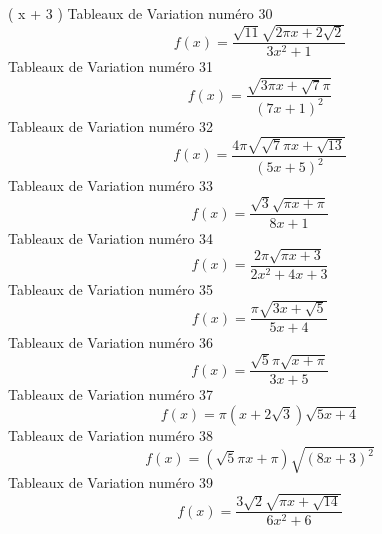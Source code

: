 \documentclass{article}
\begin{document}
 \left( \pi x + 3 \pi\right) \]Tableaux de Variation num\'ero 30 \[f(x) = \frac{\sqrt{11} \sqrt{2 \pi x + 2 \sqrt{2}}}{3 x^{2} + 1}\]Tableaux de Variation num\'ero 31 \[f(x) = \frac{\sqrt{3 \pi x + \sqrt{7} \pi}}{\left(7 x + 1\right)^{2}}\]Tableaux de Variation num\'ero 32 \[f(x) = \frac{4 \pi \sqrt{\sqrt{7} \pi x + \sqrt{13}}}{\left(5 x + 5\right)^{2}}\]Tableaux de Variation num\'ero 33 \[f(x) = \frac{\sqrt{3} \sqrt{\pi x + \pi}}{8 x + 1}\]Tableaux de Variation num\'ero 34 \[f(x) = \frac{2 \pi \sqrt{\pi x + 3}}{2 x^{2} + 4 x + 3}\]Tableaux de Variation num\'ero 35 \[f(x) = \frac{\pi \sqrt{3 x + \sqrt{5}}}{5 x + 4}\]Tableaux de Variation num\'ero 36 \[f(x) = \frac{\sqrt{5} \pi \sqrt{x + \pi}}{3 x + 5}\]Tableaux de Variation num\'ero 37 \[f(x) = \pi \left(x + 2 \sqrt{3}\right) \sqrt{5 x + 4}\]Tableaux de Variation num\'ero 38 \[f(x) = \left(\sqrt{5} \pi x + \pi\right) \sqrt{\left(8 x + 3\right)^{2}}\]Tableaux de Variation num\'ero 39 \[f(x) = \frac{3 \sqrt{2} \sqrt{\pi x + \sqrt{14}}}{6 x^{2} + 6}\]
\end{document}
